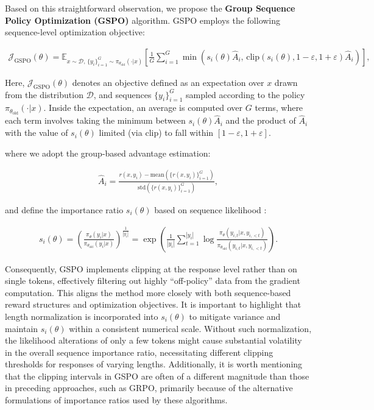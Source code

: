 Based on this straightforward observation, we propose the \textbf{Group Sequence Policy Optimization (GSPO)} algorithm. GSPO employs the following sequence-level optimization objective:

\begin{align}
\mathcal{J}_\text{GSPO} (\theta) =
\mathbb{E}_{ x \sim \mathcal{D},\, \{y_i\}_{i=1}^G \sim \pi_{\theta_\text{old}}( \cdot | x) }
\left[ 
\frac{1}{G} \sum_{i=1}^{G}
\min \left( s_{i}(\theta)  \widehat{A}_{i}, \, \mathrm{clip} \left( s_{i}(\theta), 1 - {\varepsilon}, 1 + {\varepsilon} \right) \widehat{A}_{i} \right) 
\right],
\label{equ:gspo}
\end{align}

Here, $\mathcal{J}_\text{GSPO} (\theta)$ denotes an objective defined as an expectation over $x$ drawn from the distribution $\mathcal{D}$, and sequences $\{y_i\}_{i=1}^G$ sampled according to the policy $\pi_{\theta_\text{old}}(\cdot|x)$. Inside the expectation, an average is computed over $G$ terms, where each term involves taking the minimum between $s_i(\theta)\widehat{A}_i$ and the product of $\widehat{A}_i$ with the value of $s_i(\theta)$ limited (via $\mathrm{clip}$) to fall within $[1-\varepsilon, 1+\varepsilon]$.

where we adopt the group-based advantage estimation:

\begin{align}
\widehat{A}_{i} = \frac{r(x, y_i) - \mathrm{mean} \left( \{ r(x, y_i) \}_{i=1}^G \right) }{ \mathrm{std} \left( \{ r(x, y_i) \}_{i=1}^G \right) },
\end{align}

and define the importance ratio $s_{i}(\theta)$ based on sequence likelihood \citep{click}:

\begin{align}
s_{i}(\theta) = \left( \frac{ \pi_{\theta} (y_i | x) }{ \pi_{\theta_\text{old}} (y_i | x)} \right)^{\frac{1}{|y_i|}}
=
\exp \left( \frac{1}{|y_i|} \sum_{t=1}^{|y_i|} \log \frac{ \pi_{\theta} (y_{i,t} | x, y_{i,<t}) }{ \pi_{\theta_\text{old}} (y_{i,t} | x,y_{i,<t})} \right).
\end{align}

Consequently, GSPO implements clipping at the response level rather than on single tokens, effectively filtering out highly ``off-policy'' data from the gradient computation. This aligns the method more closely with both sequence-based reward structures and optimization objectives. It is important to highlight that length normalization is incorporated into $s_{i}(\theta)$ to mitigate variance and maintain $s_{i}(\theta)$ within a consistent numerical scale. Without such normalization, the likelihood alterations of only a few tokens might cause substantial volatility in the overall sequence importance ratio, necessitating different clipping thresholds for responses of varying lengths. Additionally, it is worth mentioning that the clipping intervals in GSPO are often of a different magnitude than those in preceding approaches, such as GRPO, primarily because of the alternative formulations of importance ratios used by these algorithms.

